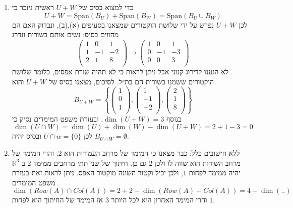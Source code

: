 \documentclass[12pt, a4paper]{article}
\newcommand{\rr}{\mathbb{R}}
\begin{document}
\begin{enumerate}
\begin{enumerate}
$$\begin{pmatrix}
    1\\0\\1\\
\end{pmatrix}$$
לכן
$\dim(U)=1$
ובסיס של 
$U$
נתון על ידי
$$.B_U=\left\{
\begin{pmatrix}
    1\\0\\1\\
\end{pmatrix}
\right\}$$
    \item 
כדי למצוא בסיס של
$U+W$
ראשית ניזכר כי
$$U+W=\mathrm{Span}(B_U)+\mathrm{Span}(B_W)=\mathrm{Span}(B_U\cup  B_W)$$
לכן
$U+W$
נפרש על ידי שלושת הוקטורים שמצאנו בסעיפים (א),(ב), ונבדוק האם הם מהווים בסיס: נשים אותם בשורות ונדרג
$$\begin{pmatrix}
    1&0&1\\
    1&-1&-2\\
    2&1&8\\
\end{pmatrix}\longrightarrow 
\begin{pmatrix}
    1&0&1\\
    0&-1&-3\\
    0&0&3\\
\end{pmatrix}$$
לא הגענו לדירוג קנוני אבל ניתן לראות כי לא תהיה שורת אפסים, כלומר שלושת הוקטורים ששמנו בשורות הם בת״ל. לסיכום, מצאנו בסיס של
$U+W$
והוא
$$B_{U+W}=\left\{
\begin{pmatrix}
    1\\0\\1\\
\end{pmatrix},
\begin{pmatrix}
    1\\-1\\-2\\
\end{pmatrix},
\begin{pmatrix}
    2\\1\\8\\
\end{pmatrix}\right\}$$
בנוסף
$\dim(U+W)=3$,
ובעזרת משפט המימדים נסיק כי
$$\dim(U\cap W)=\dim(U)+\dim(W)-\dim(U+W)=2+1-3=0$$
לכן
$U\cap w=\{0\}$
ובסיס יהיה
$B_{U\cap W}=\emptyset$.
    \item 
    ללא חישובים כלל: כבר מצאנו כי
    המימד של מרחב העמודות הוא
    $2$,
    והרי המימד של מרחב השורות הוא שווה לו ולכן 
    $2$
    גם כן. חיתוך של שני תתי-מרחבים ממימד
    $2$
    ב-$\rr^3$
    יהיה ממימד לפחות
    $1$, ולכן יכיל וקטור השונה מוקטור האפס. ניתן לראות זאת בעזרת משפט המימדים
    $$\dim(Row(A) \cap Col(A))=2+2-\dim(Row(A)+Col(A))=4-\dim(..)$$
והרי המימד האחרון הוא לכל היותר
$3$
אז המימד של החיתוך הוא לפחות
$1$.
\end{enumerate}


\end{enumerate}
\end{document}
